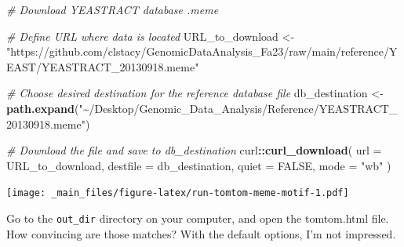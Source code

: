 \documentclass[
]{book}
\newenvironment{Shaded}{\begin{snugshade}}{\end{snugshade}}
\newcommand{\AttributeTok}[1]{\textcolor[rgb]{0.13,0.29,0.53}{#1}}
\newcommand{\CommentTok}[1]{\textcolor[rgb]{0.56,0.35,0.01}{\textit{#1}}}
\newcommand{\ConstantTok}[1]{\textcolor[rgb]{0.56,0.35,0.01}{#1}}
\newcommand{\DecValTok}[1]{\textcolor[rgb]{0.00,0.00,0.81}{#1}}
\newcommand{\FloatTok}[1]{\textcolor[rgb]{0.00,0.00,0.81}{#1}}
\newcommand{\FunctionTok}[1]{\textcolor[rgb]{0.13,0.29,0.53}{\textbf{#1}}}
\newcommand{\NormalTok}[1]{#1}
\newcommand{\OtherTok}[1]{\textcolor[rgb]{0.56,0.35,0.01}{#1}}
\newcommand{\SpecialCharTok}[1]{\textcolor[rgb]{0.81,0.36,0.00}{\textbf{#1}}}
\newcommand{\StringTok}[1]{\textcolor[rgb]{0.31,0.60,0.02}{#1}}
\begin{document}
\begin{Shaded}
\begin{Highlighting}[]
\CommentTok{\# Download YEASTRACT database .meme}

\CommentTok{\# Define URL where data is located}
\NormalTok{URL\_to\_download }\OtherTok{\textless{}{-}}
  \StringTok{"https://github.com/clstacy/GenomicDataAnalysis\_Fa23/raw/main/reference/YEAST/YEASTRACT\_20130918.meme"}

\CommentTok{\# Choose desired destination for the reference database file}
\NormalTok{db\_destination }\OtherTok{\textless{}{-}}
  \FunctionTok{path.expand}\NormalTok{(}\StringTok{"\textasciitilde{}/Desktop/Genomic\_Data\_Analysis/Reference/YEASTRACT\_20130918.meme"}\NormalTok{)}

\CommentTok{\# Download the file and save to db\_destination}
\NormalTok{curl}\SpecialCharTok{::}\FunctionTok{curl\_download}\NormalTok{(}
  \AttributeTok{url =}\NormalTok{ URL\_to\_download,}
  \AttributeTok{destfile =}\NormalTok{ db\_destination,}
  \AttributeTok{quiet =} \ConstantTok{FALSE}\NormalTok{,}
  \AttributeTok{mode =} \StringTok{"wb"}
\NormalTok{)}
\end{Highlighting}
\end{Shaded}

\begin{Shaded}
\end{Shaded}

\texttt{[image: \_main\_files/figure-latex/run-tomtom-meme-motif-1.pdf]}

Go to the \texttt{out\_dir} directory on your computer, and open the tomtom.html
file. How convincing are those matches? With the default options, I'm
not impressed.
\end{document}
